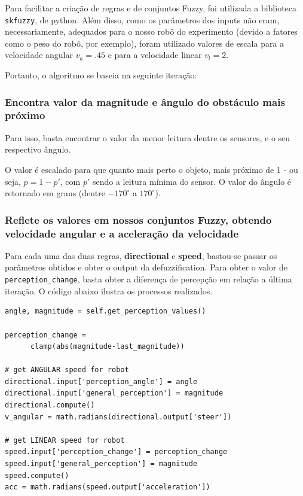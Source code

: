 \documentclass[twoside,conference,a4paper]{IEEEtran}
\begin{document}
Para facilitar a criação de regras e de conjuntos Fuzzy, foi utilizada a biblioteca \texttt{skfuzzy}, de python. Além disso, como os parâmetros dos inputs não eram, necessariamente, adequados para o nosso robô do experimento (devido a fatores como o peso do robô, por exemplo), foram utilizado valores de escala para a velocidade angular $v_{a} = .45$ e para a velocidade linear $v_{l} = 2$. 

Portanto, o algoritmo se baseia na seguinte iteração: \\

  \subsubsection{Encontra valor da magnitude e ângulo do obstáculo mais próximo}
    Para isso, basta encontrar o valor da menor leitura dentre os sensores, e o seu respectivo ângulo. 

    O valor é escalado para que quanto mais perto o objeto, mais próximo de 1 - ou seja, $p = 1-p'$, com $p'$ sendo a leitura mínima do sensor. O valor do ângulo é retornado em graus (dentre $-170^{\circ}$ a $170^{\circ}$). \\

  \subsubsection{Reflete os valores em nossos conjuntos Fuzzy, obtendo velocidade angular e a aceleração da velocidade}
    Para cada uma das duas regras, \textbf{directional} e \textbf{speed}, bastou-se passar os parâmetros obtidos e obter o output da defuzzification. Para obter o valor de \texttt{perception\_change}, basta obter a diferença de percepção em relação a última iteração. O código abaixo ilustra os processos realizados.

    \begin{lstlisting}[caption={Aplicação dos conjuntos fuzzy}]
angle, magnitude = self.get_perception_values()

perception_change = 
      clamp(abs(magnitude-last_magnitude))

# get ANGULAR speed for robot
directional.input['perception_angle'] = angle
directional.input['general_perception'] = magnitude
directional.compute()
v_angular = math.radians(directional.output['steer'])

# get LINEAR speed for robot
speed.input['perception_change'] = perception_change
speed.input['general_perception'] = magnitude
speed.compute()
acc = math.radians(speed.output['acceleration'])
    \end{lstlisting}
\end{document}
